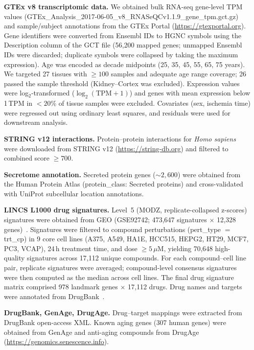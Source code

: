 \documentclass[11pt,a4paper]{article}
\begin{document}
\textbf{GTEx v8 transcriptomic data.} We obtained bulk RNA-seq gene-level TPM values (GTEx\_Analysis\_2017-06-05\_v8\_RNASeQCv1.1.9\_gene\_tpm.gct.gz) and sample/subject annotations from the GTEx Portal (\url{https://gtexportal.org}). Gene identifiers were converted from Ensembl IDs to HGNC symbols using the Description column of the GCT file (56,200 mapped genes; unmapped Ensembl IDs were discarded; duplicate symbols were collapsed by taking the maximum expression). Age was encoded as decade midpoints (25, 35, 45, 55, 65, 75 years). We targeted 27 tissues with $\geq 100$ samples and adequate age range coverage; 26 passed the sample threshold (Kidney--Cortex was excluded). Expression values were log$_2$-transformed ($\log_2(\text{TPM} + 1)$) and genes with mean expression below 1\,TPM in $< 20$\% of tissue samples were excluded. Covariates (sex, ischemia time) were regressed out using ordinary least squares, and residuals were used for downstream analysis.

\textbf{STRING v12 interactions.} Protein--protein interactions for \textit{Homo sapiens} were downloaded from STRING v12 (\url{https://string-db.org}) and filtered to combined score $\geq 700$.

\textbf{Secretome annotation.} Secreted protein genes (${\sim}2{,}600$) were obtained from the Human Protein Atlas (protein\_class: Secreted proteins) and cross-validated with UniProt subcellular location annotations.

\textbf{LINCS L1000 drug signatures.} Level~5 (MODZ, replicate-collapsed z-scores) signatures were obtained from GEO (GSE92742; 473,647 signatures $\times$ 12,328 genes)~\cite{ref37}. Signatures were filtered to compound perturbations (pert\_type $=$ trt\_cp) in 9 core cell lines (A375, A549, HA1E, HCC515, HEPG2, HT29, MCF7, PC3, VCAP), 24\,h treatment time, and dose $\geq 5$\,$\mu$M, yielding 70,648 high-quality signatures across 17,112 unique compounds. For each compound--cell line pair, replicate signatures were averaged; compound-level consensus signatures were then computed as the median across cell lines. The final drug signature matrix comprised 978 landmark genes $\times$ 17,112 drugs. Drug names and targets were annotated from DrugBank~\cite{ref49}.

\textbf{DrugBank, GenAge, DrugAge.} Drug--target mappings were extracted from DrugBank open-access XML. Known aging genes (307 human genes) were obtained from GenAge and anti-aging compounds from DrugAge (\url{https://genomics.senescence.info}).
\end{document}
